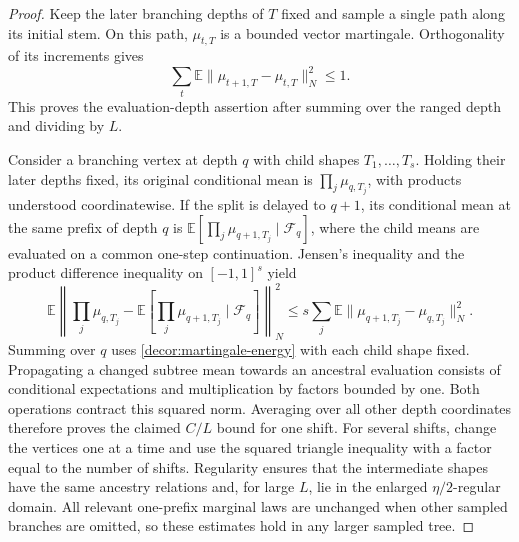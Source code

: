 \begin{proof}
Keep the later branching depths of $T$ fixed and sample a single path
along its initial stem. On this path, $\mu_{t,T}$ is a bounded vector
martingale. Orthogonality of its increments gives
\begin{equation}
 \sum_t\mathbb E\|\mu_{t+1,T}-\mu_{t,T}\|_N^2\le1.
 \label{decor:martingale-energy}
\end{equation}
This proves the evaluation-depth assertion after summing over the
ranged depth and dividing by $L$.

Consider a branching vertex at depth $q$ with child shapes
$T_1,\ldots,T_s$.  Holding their later depths fixed, its original
conditional mean is $\prod_j \mu_{q,T_j}$, with products understood
coordinatewise.  If the split is delayed to $q+1$, its conditional mean
at the same prefix of depth $q$ is
$\mathbb E[\prod_j \mu_{q+1,T_j}\mid\mathscr F_q]$, where the child means
are evaluated on a common one-step continuation.  Jensen's inequality
and the product difference inequality on $[-1,1]^s$ yield
\begin{equation}
 \mathbb E\left\|\prod_j \mu_{q,T_j}
       -\mathbb E\left[\prod_j \mu_{q+1,T_j}\mid\mathscr F_q\right]
       \right\|_N^2
 \le s\sum_j\mathbb E\|\mu_{q+1,T_j}-\mu_{q,T_j}\|_N^2.
 \label{decor:one-vertex-shift}
\end{equation}
Summing over $q$ uses \eqref{decor:martingale-energy} with each child
shape fixed.  Propagating a changed subtree mean towards an ancestral
evaluation consists of conditional expectations and multiplication
by factors bounded by one.  Both operations contract this squared
norm.  Averaging over all other depth coordinates therefore proves
the claimed $C/L$ bound for one shift.  For several shifts, change the
vertices one at a time and use the squared triangle inequality with
a factor equal to the number of shifts.  Regularity ensures that the
intermediate shapes have the same ancestry relations and, for large
$L$, lie in the enlarged $\eta/2$-regular domain.  All relevant
one-prefix marginal laws are unchanged when other sampled branches
are omitted, so these estimates hold in any larger sampled tree.
\end{proof}

